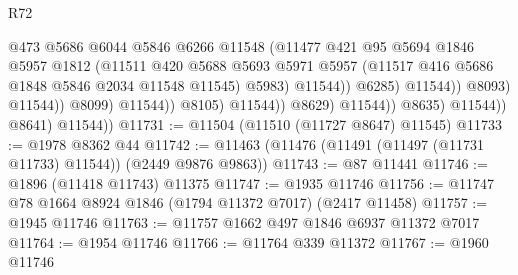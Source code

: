 \begin{lexlean}{R72}
\begin{coremodule}
                                                @473
                                                @5686
                                                @6044
                                                @5846
                                                @6266
                                                @11548
                                                (@11477
                                                  @421
                                                  @95
                                                  @5694
                                                  @1846
                                                  @5957
                                                  @1812
                                                  (@11511
                                                    @420
                                                    @5688
                                                    @5693
                                                    @5971
                                                    @5957
                                                    (@11517
                                                      @416
                                                      @5686
                                                      @1848
                                                      @5846
                                                      @2034
                                                      @11548
                                                      @11545)
                                                    @5983)
                                                  @11544))
                                              @6285)
                                            @11544))
                                        @8093)
                                      @11544))
                                  @8099)
                                @11544))
                            @8105)
                          @11544))
                      @8629)
                    @11544))
                @8635)
              @11544))
          @8641)
        @11544))
@11731 := @11504 (@11510 (@11727 @8647) @11545)
@11733 := @1978 @8362 @44
@11742 := @11463 (@11476 (@11491 (@11497 (@11731 @11733) @11544)) (@2449 @9876 @9863))
@11743 := @87 @11441
@11746 := @1896 (@11418 @11743) @11375
@11747 := @1935 @11746
@11756 := @11747 @78 @1664 @8924 @1846 (@1794 @11372 @7017) (@2417 @11458)
@11757 := @1945 @11746
@11763 := @11757 @1662 @497 @1846 @6937 @11372 @7017
@11764 := @1954 @11746
@11766 := @11764 @339 @11372
@11767 := @1960 @11746

\end{coremodule}
\end{lexlean}

